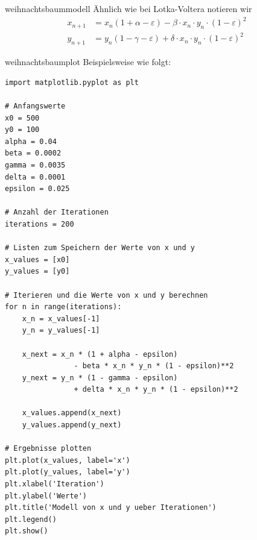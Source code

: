 \documentclass[%
<<<<<<< Updated upstream
11pt,%
twoside,%
titlepage,%
german,%
headsepline%
]{scrartcl}
\begin{document}
\begin{lsg}{weihnachtsbaummodell}
Ähnlich wie bei Lotka-Voltera notieren wir
\begin{align*}
x_{n+1}&=x_n(1+\alpha-\varepsilon)-\beta\cdot x_n\cdot y_n\cdot(1-\varepsilon)^2\\
y_{n+1}&=y_n(1-\gamma-\varepsilon)+\delta\cdot x_n\cdot y_n\cdot(1-\varepsilon)^2
\end{align*}
\end{lsg}
\begin{lsg}{weihnachtsbaumplot}
Beispielsweise wie folgt:

\begin{lstlisting}
import matplotlib.pyplot as plt

# Anfangswerte
x0 = 500
y0 = 100
alpha = 0.04
beta = 0.0002
gamma = 0.0035
delta = 0.0001
epsilon = 0.025

# Anzahl der Iterationen
iterations = 200

# Listen zum Speichern der Werte von x und y
x_values = [x0]
y_values = [y0]

# Iterieren und die Werte von x und y berechnen
for n in range(iterations):
    x_n = x_values[-1]
    y_n = y_values[-1]
    
    x_next = x_n * (1 + alpha - epsilon) 
    			- beta * x_n * y_n * (1 - epsilon)**2
    y_next = y_n * (1 - gamma - epsilon) 
    			+ delta * x_n * y_n * (1 - epsilon)**2
    
    x_values.append(x_next)
    y_values.append(y_next)

# Ergebnisse plotten
plt.plot(x_values, label='x')
plt.plot(y_values, label='y')
plt.xlabel('Iteration')
plt.ylabel('Werte')
plt.title('Modell von x und y ueber Iterationen')
plt.legend()
plt.show()
\end{lstlisting}
\end{lsg}

\clearpage




\end{document}
